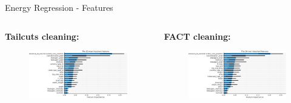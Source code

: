\begin{frame}{Energy Regression - Features}
    \begin{columns}[T] %
        \begin{column}{.48\textwidth}
            \textbf{Tailcuts cleaning:}
            \vspace{5pt}
            \begin{figure}
                \includegraphics[width=\linewidth]{images/result_plots/tail1/reg_diff_4-crop.pdf}
            \end{figure}
        \end{column}
        \begin{column}{.48\textwidth}
            \textbf{FACT cleaning:}
            \vspace{5pt}
            \begin{figure}
                \includegraphics[width=\linewidth]{images/result_plots/fact2/reg_diff_4-crop.pdf}
            \end{figure}
        \end{column}
    \end{columns}
\end{frame}
